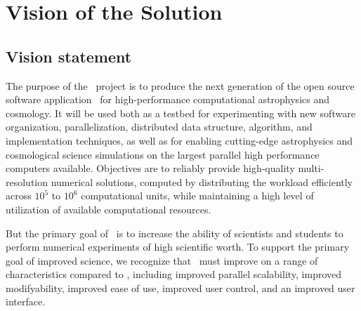 \documentclass[11pt]{article}
\begin{document}
\section{Vision of the Solution}

\subsection{Vision statement}



    The purpose of the \cello\ project is to produce the next
    generation of the open source software application \enzo\ for
    high-performance computational astrophysics and cosmology.  It
    will be used both as a testbed for experimenting with new software
    organization, parallelization, distributed data structure,
    algorithm, and implementation techniques, as well as for enabling
    cutting-edge astrophysics and cosmological science simulations on
    the largest parallel high performance computers available.
    Objectives are to reliably provide high-quality multi-resolution
    numerical solutions, computed by distributing the workload
    efficiently across $10^5$ to $10^6$ computational units, while
    maintaining a high level of utilization of available computational
    resources.


    But the primary goal of \cello\ is to increase the ability of
    scientists and students
    to perform numerical experiments of high scientific worth.
    To support the primary goal of improved science, we recognize that
    \cello\ must improve on a range of characteristics compared to
    \enzo, including 
%
    improved parallel scalability,
    improved modifyability, 
    improved ease of use, 
    improved user control,
    and an improved user interface.
\end{document}
